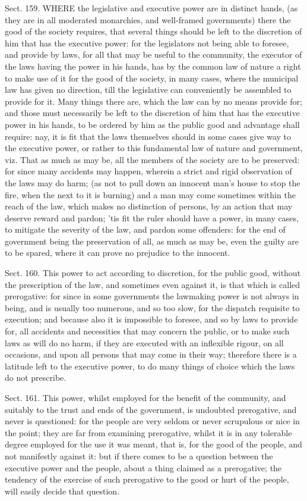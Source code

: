 \documentclass[11pt,openany]{book}
\begin{document}
Sect. 159. WHERE the legislative and executive power are in distinct hands, (as they are in all moderated monarchies, and well-framed governments) there the good of the society requires, that several things should be left to the discretion of him that has the executive power: for the legislators not being able to foresee, and provide by laws, for all that may be useful to the community, the executor of the laws having the power in his hands, has by the common law of nature a right to make use of it for the good of the society, in many cases, where the municipal law has given no direction, till the legislative can conveniently be assembled to provide for it. Many things there are, which the law can by no means provide for; and those must necessarily be left to the discretion of him that has the executive power in his hands, to be ordered by him as the public good and advantage shall require: nay, it is fit that the laws themselves should in some cases give way to the executive power, or rather to this fundamental law of nature and government, viz. That as much as may be, all the members of the society are to be preserved: for since many accidents may happen, wherein a strict and rigid observation of the laws may do harm; (as not to pull down an innocent man's house to stop the fire, when the next to it is burning) and a man may come sometimes within the reach of the law, which makes no distinction of persons, by an action that may deserve reward and pardon; 'tis fit the ruler should have a power, in many cases, to mitigate the severity of the law, and pardon some offenders: for the end of government being the preservation of all, as much as may be, even the guilty are to be spared, where it can prove no prejudice to the innocent.

Sect. 160. This power to act according to discretion, for the public good, without the prescription of the law, and sometimes even against it, is that which is called prerogative: for since in some governments the lawmaking power is not always in being, and is usually too numerous, and so too slow, for the dispatch requisite to execution; and because also it is impossible to foresee, and so by laws to provide for, all accidents and necessities that may concern the public, or to make such laws as will do no harm, if they are executed with an inflexible rigour, on all occasions, and upon all persons that may come in their way; therefore there is a latitude left to the executive power, to do many things of choice which the laws do not prescribe.

Sect. 161. This power, whilst employed for the benefit of the community, and suitably to the trust and ends of the government, is undoubted prerogative, and never is questioned: for the people are very seldom or never scrupulous or nice in the point; they are far from examining prerogative, whilst it is in any tolerable degree employed for the use it was meant, that is, for the good of the people, and not manifestly against it: but if there comes to be a question between the executive power and the people, about a thing claimed as a prerogative; the tendency of the exercise of such prerogative to the good or hurt of the people, will easily decide that question.
\end{document}
